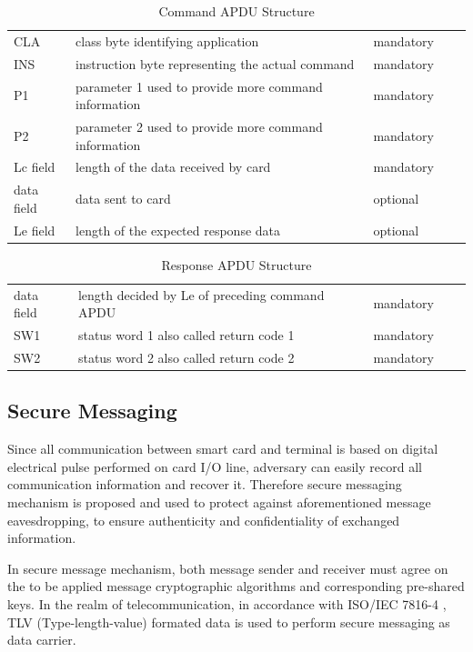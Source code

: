 \begin{table}[!htbp]
\caption{Command APDU Structure}
\centering
\begin{tabular}{lllll}
\hline\hline
 CLA &class byte identifying application  & mandatory \\[0.5ex]
 INS &instruction byte representing the actual command  & mandatory \\
 P1 &parameter 1 used to provide more command information & mandatory \\
 P2 &parameter 2 used to provide more command information& mandatory \\
 Lc field & length of the data received by card & mandatory \\
 data field &data sent to card& optional \\
Le field & length of the expected response data& optional \\
\hline
\end{tabular}
\label{table:capdu}
\end{table}

\begin{table}[ht]
\caption{Response APDU Structure}
\centering
\begin{tabular}{lllll}
\hline\hline
 data field & length decided by Le of preceding command  APDU  & mandatory \\[0.5ex]
 SW1 &status word 1 also called return code 1  & mandatory \\
 SW2 &status word 2 also called return code 2& mandatory \\
\hline
\end{tabular}
\label{table:rapdu}
\end{table}

\subsection{Secure Messaging} \label{secTLV}
Since all communication between smart card and terminal is based on digital electrical pulse performed on card I/O line, adversary can easily record all communication information and recover it. Therefore secure messaging mechanism is proposed and used to protect against aforementioned message eavesdropping, to ensure authenticity and confidentiality of exchanged information.

In secure message mechanism, both message sender and receiver must agree on the to be applied message cryptographic algorithms and corresponding pre-shared keys. In the realm of telecommunication, in accordance with ISO/IEC 7816-4 \cite{handbuch}, TLV (Type-length-value) formated data is used to perform secure messaging as data carrier.

